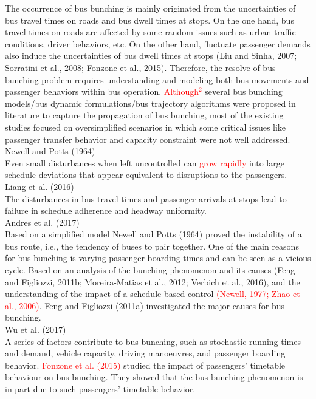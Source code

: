 \documentclass{article}
\begin{document}
The occurrence of bus bunching is mainly originated from the uncertainties of bus travel times on roads and bus dwell times at stops. 
On the one hand, bus travel times on roads are affected by some random issues such as urban traffic conditions, driver behaviors, etc.
On the other hand, fluctuate passenger demands also induce the uncertainties of bus dwell times at stops (Liu and Sinha, 2007; Sorratini et al., 2008; Fonzone et al., 2015).
Therefore, the resolve of bus bunching problem requires understanding and modeling both bus movements and passenger behaviors within bus operation. 
\textcolor{red}{Although$^2$} several bus bunching models/bus dynamic formulations/bus trajectory algorithms were proposed in literature to capture the propagation of bus bunching, 
most of the existing studies focused on oversimplified scenarios in which some critical issues like passenger transfer behavior and capacity constraint were not well addressed.\\

\noindent \textrm{Newell and Potts (1964)}\\
Even small disturbances when left uncontrolled 
can \textcolor{red}{grow rapidly} into large schedule deviations 
that appear equivalent to disruptions to the passengers.\\

\noindent \textrm{Liang et al. (2016)}\\
The disturbances in bus travel times and passenger arrivals at stops 
lead to failure in schedule adherence and headway uniformity.\\

\noindent \textrm{Andres et al. (2017)}\\
Based on a simplified model \textrm{Newell and Potts (1964)} proved the instability of a bus route,
i.e., the tendency of buses to pair together.
One of the main reasons for bus bunching is varying passenger boarding times 
and can be seen as a vicious cycle.
Based on an analysis of the bunching phenomenon and its causes 
\textrm{(Feng and Figliozzi, 2011b; Moreira-Matias et al., 2012; Verbich et al., 2016)}, 
and the understanding of the impact of a schedule based control 
\textcolor{red}{\textrm{(Newell, 1977; Zhao et al., 2006)}}. 
\textrm{Feng and Figliozzi (2011a)} investigated the major causes for bus bunching.\\

\noindent \textrm{Wu et al. (2017)}\\
A series of factors contribute to bus bunching, 
such as stochastic running times and demand, vehicle capacity, driving manoeuvres, 
and passenger boarding behavior.
\textcolor{red}{\textrm{Fonzone et al. (2015)}} studied the impact of passengers’ timetable behaviour on bus bunching. 
They showed that the bus bunching phenomenon is in part due to such passengers’ timetable behavior.\\
\end{document}
